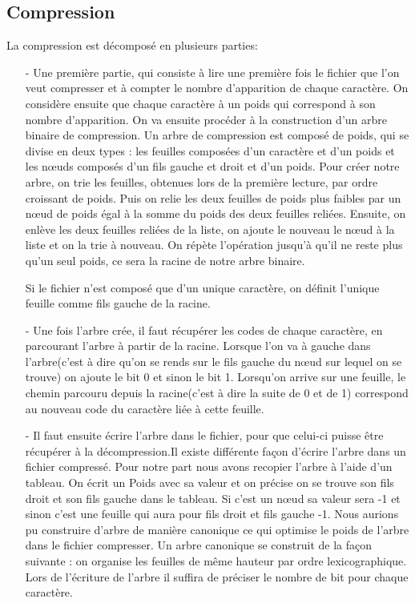 \documentclass{report}
\begin{document}
\subsection*{Compression}
La compression est décomposé en plusieurs parties:
\begin{itemize}
\item[-] Une première partie, qui consiste à lire une première fois le fichier que l'on veut compresser et à compter le nombre d'apparition de chaque caractère. On considère ensuite que chaque caractère à un poids qui correspond à son nombre d'apparition. On va ensuite procéder à la construction d'un arbre binaire de compression. Un arbre de compression est composé de poids, qui se divise en deux types : les feuilles composées d'un caractère et d'un poids et les  nœuds composés d'un fils gauche et droit et d'un poids. Pour créer notre arbre, on trie les feuilles, obtenues lors de la première lecture, par ordre croissant de poids. Puis on relie les deux feuilles de poids plus faibles par un nœud de poids égal à la somme du poids des deux feuilles reliées.  Ensuite, on enlève les deux feuilles reliées de la liste, on ajoute le nouveau le  nœud à  la liste et on la trie à nouveau. On répète l'opération jusqu'à qu'il ne reste plus qu'un seul poids, ce sera la racine de notre arbre binaire.

Si le fichier n'est composé que d'un unique caractère, on définit l'unique feuille comme fils gauche de la racine.\\

\item[-]Une fois l'arbre crée, il faut récupérer les codes de chaque caractère, en parcourant l'arbre à partir de la racine. Lorsque l'on va à gauche dans l'arbre(c'est à dire qu'on se rends sur le fils gauche du nœud sur lequel on se trouve) on ajoute le bit 0 et sinon le bit 1. Lorsqu'on arrive sur une feuille, le chemin parcouru depuis la racine(c'est à dire la suite de 0 et de 1) correspond au nouveau code du caractère liée à cette feuille.\\

\item[-]Il faut ensuite écrire l'arbre dans le fichier, pour que celui-ci puisse être récupérer à la décompression.Il existe différente façon d'écrire l'arbre dans un fichier compressé. Pour notre part nous avons recopier l'arbre à l'aide d'un tableau. On écrit un Poids avec sa valeur et on précise on se trouve son fils droit et son fils gauche dans le tableau. Si c'est un  nœud  sa valeur sera -1 et sinon c'est une feuille qui aura pour fils droit et fils gauche -1.
Nous aurions pu construire d'arbre de manière canonique ce qui optimise le poids de l'arbre dans le fichier compresser. Un arbre canonique se construit de la façon suivante :
on organise les feuilles de même hauteur par ordre lexicographique. Lors de l'écriture de l'arbre il suffira de préciser le nombre de bit pour chaque caractère.\\


\end{itemize}
\end{document}
